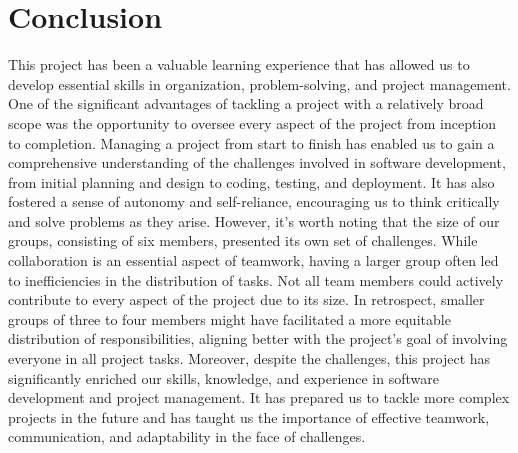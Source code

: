 \documentclass[12pt, a4paper]{article}
\begin{document}
\newpage
\section{Conclusion}
This project has been a valuable learning experience that has allowed
us to develop essential skills in organization, problem-solving, and
project management. One of the significant advantages of tackling a project
with a relatively broad scope was the opportunity to oversee every aspect
of the project from inception to completion.
Managing a project from start to finish has enabled us to gain a
comprehensive understanding of the challenges involved in software
development, from initial planning and design to coding, testing,
and deployment. It has also fostered a sense of autonomy and self-reliance,
encouraging us to think critically and solve problems as they arise.
However, it's worth noting that the size of our groups, consisting of
six members, presented its own set of challenges. While collaboration
is an essential aspect of teamwork, having a larger group often led
to inefficiencies in the distribution of tasks. Not all team members
could actively contribute to every aspect of the project due to its
size. In retrospect, smaller groups of three to four members might
have facilitated a more equitable distribution of responsibilities,
aligning better with the project's goal of involving everyone in all
project tasks.
Moreover, despite the challenges, this project has significantly
enriched our skills, knowledge, and experience in software development
and project management. It has prepared us to tackle more complex projects
in the future and has taught us the importance of effective teamwork,
communication, and adaptability in the face of challenges.
\end{document}
